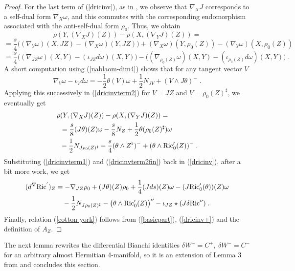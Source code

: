 \documentclass{amsart}
\newcommand{\na}{\nabla}
\begin{document}
\begin{proof}
\noindent
For the last term of (\ref{dricinv}), as in \cite{AAD}, we observe that $\na_X J$ corresponds to a self-dual form $\na_X \omega$, and this commutes with the corresponding endomorphism associated with the anti-self-dual form $\rho_0$. Thus, we obtain
\begin{equation} \label{dricinvterm2} 
 \rho(Y, (\na_X J)(Z)) - \rho(X, (\na_Y J)(Z) )  = 
\end{equation} 
$$= \frac{s}{4}\Big((\na_Y \omega)(X, JZ) -(\na_X \omega)(Y, JZ) \Big
) + (\na_X \omega)(Y, \rho_0(Z)) - (\na_Y \omega) (X,
\rho_0(Z))  $$ 
$$ = \frac{s}{4} \Big( (\na_{JZ} \omega) (X,Y) - (\iota_{JZ} d \omega) (X,Y) \Big) - \Big( (\na_{{\rho_0} (Z)} \omega)(X,Y) - (\iota_{{\rho_0} (Z)} d \omega)(X, Y) \Big) \; .$$
A short computation using (\ref{nablaom-dim4}) shows that for any tangent vector $V$
$$ \nabla_{V} \omega - \iota_{V} d \omega = -\frac{1}{2} \theta(V) \omega + \frac{1}{2} N_{JV} + (V \wedge J\theta)^{-} \; .$$
Applying this successively in (\ref{dricinvterm2}) for $V = JZ$ and $V= {\rho_0} (Z)^\sharp$, we eventually get 
\begin{equation} \label{dricinvterm2fin} \begin{split}
\rho &(Y, (\na_X J)(Z)) - \rho(X, (\na_Y J)(Z) )  = \\ & 
= \frac{s}{8} (J\theta)(Z) \omega -  \frac{s}{8} N_Z + \frac{1}{2} \theta(\rho_0(Z)^\sharp) \omega \\ & - \frac{1}{2} N_{J\rho_0(Z)^\sharp} - \frac{s}{4} (\theta \wedge Z^{\flat})^{-} + (\theta \wedge {\rm Ric}_0'(Z))^{-}   \; .
\end{split} \end{equation}
Substituting (\ref{dricinvterm1}) and (\ref{dricinvterm2fin}) back in (\ref{dricinv}), after a bit more work, we get
\begin{equation} \label{dricinv+} \begin{split}
(d^{\na} {\rm Ric}^{'})_Z &= - \na_{JZ} \rho_0 + (J\theta)(Z) \rho_0 + \frac{1}{4}(J ds)(Z) \omega - (J{\rm Ric}_0'(\theta))(Z) \omega \\ & \ \ \ - \frac{1}{2} N_{J\rho_0(Z)^\sharp} - \big(\theta \wedge {\rm Ric}_0'(Z) \big)'' - \iota_{JZ} \star (J\delta {\rm Ric}'')\; .
\end{split} \end{equation}
Finally, relation (\ref{cotton-york}) follows from (\ref{basicpart}), (\ref{dricinv+}) and the definition of $A_Z$. 
\end{proof} 

\noindent
The next lemma rewrites the differential Bianchi
identities $\delta W ^{+}  = C ^{+}, \ \delta W ^{-}  = C ^{-} $ for an arbitrary almost Hermitian 4-manifold, so it is an extension of Lemma 3 from \cite{AAD} and concludes this section.
\end{document}
